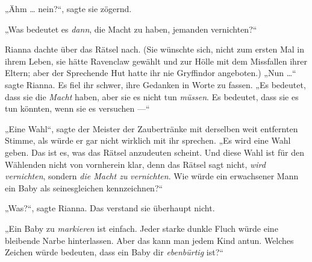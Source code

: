 „Ähm … nein?“, sagte sie zögernd.

„Was bedeutet es \emph{dann}, die Macht zu haben, jemanden vernichten?“

Rianna dachte über das Rätsel nach. (Sie wünschte sich, nicht zum ersten Mal in ihrem Leben, sie hätte Ravenclaw gewählt und zur Hölle mit dem Missfallen ihrer Eltern; aber der Sprechende Hut hatte ihr nie Gryffindor angeboten.)
„Nun …“ sagte Rianna. Es fiel ihr schwer, ihre Gedanken in Worte zu fassen.
„Es bedeutet, dass sie die \emph{Macht} haben, aber sie es nicht tun \emph{müssen}. Es bedeutet, dass sie es tun könnten, wenn sie es versuchen —“

„Eine Wahl“, sagte der Meister der Zaubertränke mit derselben weit entfernten Stimme, als würde er gar nicht wirklich mit ihr sprechen.
„Es wird eine Wahl geben. Das ist es, was das Rätsel anzudeuten scheint. Und diese Wahl ist für den Wählenden nicht von vornherein klar, denn das Rätsel sagt nicht, \emph{wird} \emph{vernichten}, sondern \emph{die Macht zu} \emph{vernichten}. Wie würde ein erwachsener Mann ein Baby als seinesgleichen kennzeichnen?“

„Was?“, sagte Rianna. Das verstand sie überhaupt nicht.

„Ein Baby zu \emph{markieren} ist einfach. Jeder starke dunkle Fluch würde eine bleibende Narbe hinterlassen. Aber das kann man jedem Kind antun. Welches Zeichen würde bedeuten, dass ein Baby dir \emph{ebenbürtig} ist?“

